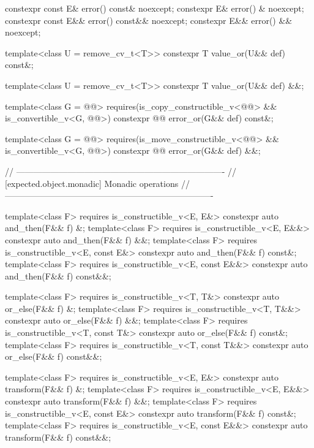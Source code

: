 \begin{codeblock}
{{    constexpr const E& error() const& noexcept;
    constexpr E& error() & noexcept;
    constexpr const E&& error() const&& noexcept;
    constexpr E&& error() && noexcept;

    template<class U = remove_cv_t<T>> constexpr T value_or(U&& def) const&;

    template<class U = remove_cv_t<T>> constexpr T value_or(U&& def) &&;

    template<class G = @@>
      requires(is_copy_constructible_v<@@> &&
               is_convertible_v<G, @@>)
    constexpr @@ error_or(G&& def) const&;

    template<class G = @@>
      requires(is_move_constructible_v<@@> &&
               is_convertible_v<G, @@>)
    constexpr @@ error_or(G&& def) &&;

    // -------------------------------------------------------------------------
    // [expected.object.monadic] Monadic operations
    // -------------------------------------------------------------------------

    template<class F>
      requires is_constructible_v<E, E&>
    constexpr auto and_then(F&& f) &;
    template<class F>
      requires is_constructible_v<E, E&&>
    constexpr auto and_then(F&& f) &&;
    template<class F>
      requires is_constructible_v<E, const E&>
    constexpr auto and_then(F&& f) const&;
    template<class F>
      requires is_constructible_v<E, const E&&>
    constexpr auto and_then(F&& f) const&&;

    template<class F>
      requires is_constructible_v<T, T&>
    constexpr auto or_else(F&& f) &;
    template<class F>
      requires is_constructible_v<T, T&&>
    constexpr auto or_else(F&& f) &&;
    template<class F>
      requires is_constructible_v<T, const T&>
    constexpr auto or_else(F&& f) const&;
    template<class F>
      requires is_constructible_v<T, const T&&>
    constexpr auto or_else(F&& f) const&&;

    template<class F>
      requires is_constructible_v<E, E&>
    constexpr auto transform(F&& f) &;
    template<class F>
      requires is_constructible_v<E, E&&>
    constexpr auto transform(F&& f) &&;
    template<class F>
      requires is_constructible_v<E, const E&>
    constexpr auto transform(F&& f) const&;
    template<class F>
      requires is_constructible_v<E, const E&&>
    constexpr auto transform(F&& f) const&&;

}}
\end{codeblock}
